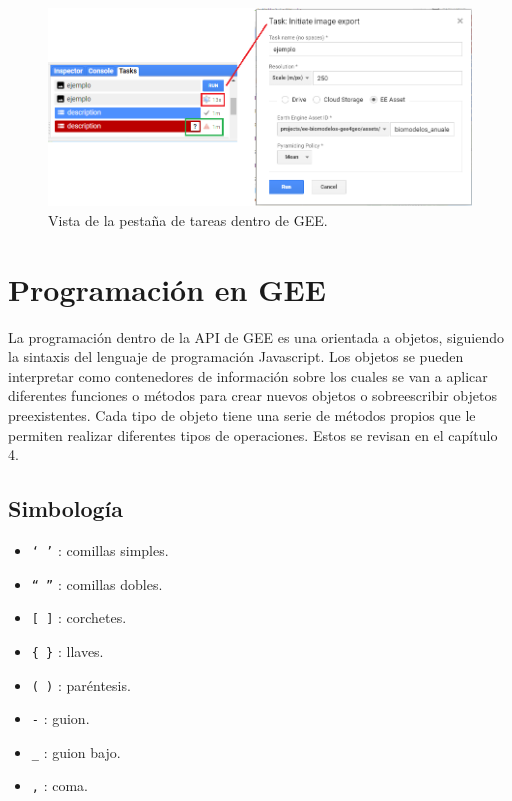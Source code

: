 \documentclass[
  12pt,
  letterpaper,
  twoside]{book}
\providecommand{\tightlist}{%
  \setlength{\itemsep}{0pt}\setlength{\parskip}{0pt}}
\begin{document}
\begin{figure}[btp]

{\centering \includegraphics[width=0.8\linewidth]{Img/task} 

}

\caption{Vista de la pestaña de tareas dentro de GEE.}\label{fig:unnamed-chunk-23}
\end{figure}

\hypertarget{programaciuxf3n-en-gee}{%
\section{Programación en GEE}\label{programaciuxf3n-en-gee}}

La programación dentro de la API de GEE es una orientada a objetos, siguiendo la sintaxis del lenguaje de programación Javascript. Los objetos se pueden interpretar como contenedores de información sobre los cuales se van a aplicar diferentes funciones o métodos para crear nuevos objetos o sobreescribir objetos preexistentes. Cada tipo de objeto tiene una serie de métodos propios que le permiten realizar diferentes tipos de operaciones. Estos se revisan en el capítulo 4.

\hypertarget{simbologuxeda}{%
\subsection{Simbología}\label{simbologuxeda}}

\begin{itemize}
\tightlist
\item
  \texttt{‘\ ’} : comillas simples.
\item
  \texttt{“\ ”} : comillas dobles.
\item
  \texttt{{[}\ {]}} : corchetes.
\item
  \texttt{\{\ \}} : llaves.
\item
  \texttt{(\ )} : paréntesis.
\item
  \texttt{-} : guion.
\item
  \texttt{\_} : guion bajo.
\item
  \texttt{,} : coma.
\end{itemize}
\end{document}
